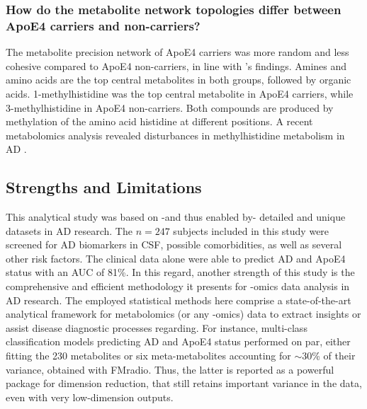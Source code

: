\documentclass{amsart}
\begin{document}
\subsubsection{How do the metabolite network topologies differ between ApoE4 carriers and non-carriers?}
The metabolite precision network of ApoE4 carriers was more random and less cohesive compared to ApoE4 non-carriers, in line with \citeauthor{deLeeuw2017Blood-basedDisease}'s findings. Amines and amino acids are the top central metabolites in both groups, followed by organic acids. 1-methylhistidine was the top central metabolite in ApoE4 carriers, while 3-methylhistidine in ApoE4 non-carriers. Both compounds are produced by methylation of the amino acid histidine at different positions. A recent metabolomics analysis revealed disturbances in methylhistidine metabolism in AD \cite{kalecky2022targeted}.

\subsection{Strengths and Limitations} This analytical study was based on -and thus enabled by- detailed and unique datasets in AD research. The $n = 247$ subjects included in this study were screened for AD biomarkers in CSF, possible comorbidities, as well as several other risk factors. The clinical data alone were able to predict AD and ApoE4 status with an AUC of 81\%. In this regard, another strength of this study is the comprehensive and efficient methodology it presents for -omics data analysis in AD research. The employed statistical methods here comprise a state-of-the-art analytical framework for metabolomics (or any -omics) data to extract insights or assist disease diagnostic processes regarding. For instance, multi-class classification models predicting AD and ApoE4 status performed on par, either fitting the 230 metabolites or six meta-metabolites accounting for $\sim$30\% of their variance, obtained with \textsf{FMradio}. Thus, the latter is reported as a powerful package for dimension reduction, that still retains important variance in the data, even with very low-dimension outputs.
\end{document}
